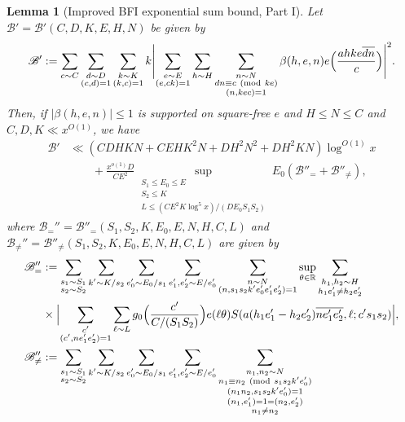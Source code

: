 \documentclass[10pt]{amsart}
\theoremstyle{plain}
\newtheorem{lmm}[thrm]{Lemma}
\numberwithin{equation}{section}
\newcommand{\Mod}[1]{\ (\mathrm{mod}\ #1)}
\begin{document}
%
%
%
%
%
%
%
%
\begin{lmm}[Improved BFI exponential sum bound, Part I]\label{lmm:BFI1}
Let $\mathscr{B}'=\mathscr{B}'(C,D,K,E,H,N)$ be given by
\[
\mathscr{B}':=\sum_{ c\sim  C}\sum_{\substack{ d\sim D\\ (c,d)=1}}\sum_{\substack{ k\sim K \\ (k,c)=1}}k\Biggl|\sum_{\substack{e\sim E\\ (e,ck)=1}}\sum_{ h\sim H}\sum_{\substack{ n\sim N\\ d n\equiv c\Mod{k e}\\ (n,k e c)=1}}\beta(h,e,n)e\Bigl(\frac{a h k e \overline{d n}}{c}\Bigr)\Biggr|^2.
\]
Then, if $|\beta(h,e,n)|\le 1$ is supported on square-free $e$ and $H\le N\le C$ and $C,D,K\ll x^{O(1)}$, we have
\begin{align*}
\mathscr{B}'&\ll (C D H K N + C E H K^2 N+D H^2 N^2+D H^2 K N)\log^{O(1)}{x}\\
&\qquad +\frac{x^{o(1)} D }{C E^2}\sup_{\substack{S_1\le E_0\le E\\ S_2\le K \\ L\le (C E^2 K \log^5{x})/(D E_0 S_1 S_2)}}E_0(\mathscr{B}''_=+\mathscr{B}''_{\ne}),
\end{align*}
where $\mathscr{B}_{=}''=\mathscr{B}''_{=}(S_1,S_2,K,E_0,E,N,H,C,L)$ and $\mathscr{B}_{\ne}''=\mathscr{B}''_{\ne}(S_1,S_2,K,E_0,E,N,H,C,L)$ are given by
\begin{align*}
\mathscr{B}''_=&:=\sum_{\substack{s_1\sim S_1\\ s_2\sim S_2}}\sum_{\substack{k'\sim K/s_2}} \sum_{\substack{e_0'\sim E_0/s_1}}\sum_{\substack{e_1',e_2'\sim E/e_0'}}\sum_{\substack{n\sim N\\ (n,s_1s_2 k' e_0'e_1'e_2')=1}}\sup_{\theta\in\mathbb{R}}\sum_{\substack{h_1,h_2\sim H\\ h_1e_1'\ne h_2e_2'}}\\
&\times\Bigl|\sum_{\substack{c'\\ (c',n e_1'e_2')=1}}\sum_{\ell\sim L}g_{0}\Bigl(\frac{c'}{C/(S_1S_2)}\Bigr)e(\ell \theta)S(a(h_1e_1'-h_2e_2')\overline{n e_1' e_2'},\ell;c' s_1 s_2)\Bigr|,\\
\mathscr{B}''_{\ne}&:=\sum_{\substack{s_1\sim S_1\\ s_2\sim S_2}}\sum_{\substack{k'\sim K/s_2}} \sum_{\substack{e_0'\sim E_0/s_1}}\sum_{\substack{e_1',e_2'\sim E/e_0'}}\sum_{\substack{n_1,n_2\sim N\\ n_1\equiv n_2\Mod{s_1 s_2 k' e_0'}\\ (n_1n_2,s_1s_2 k' e_0')=1\\ (n_1,e_1')=1=(n_2,e_2')\\ n_1\ne n_2}}\\

\end{align*}
\end{lmm}
\end{document}
